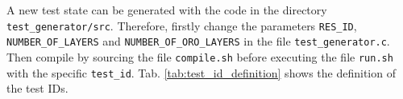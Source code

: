 \documentclass[10pt]{report}
\begin{document}
A new test state can be generated with the code in the directory \texttt{test\_generator/src}. Therefore, firstly change the parameters \texttt{RES\_ID}, \texttt{NUMBER\_OF\_LAYERS} and \texttt{NUMBER\_OF\_ORO\_LAYERS} in the file \texttt{test\_generator.c}. Then compile by sourcing the file \texttt{compile.sh} before executing the file \texttt{run.sh} with the specific \texttt{test\_id}. Tab. \ref{tab:test_id_definition} shows the definition of the test IDs.
\end{document}
